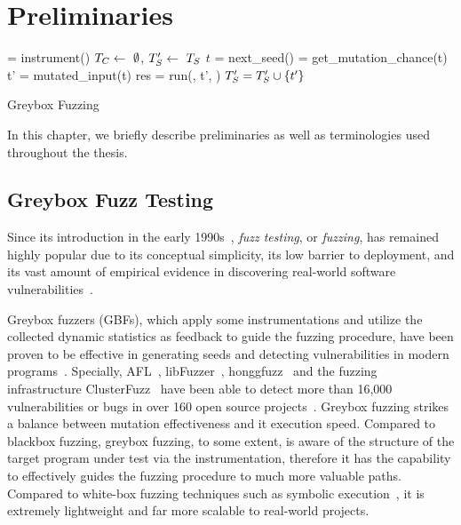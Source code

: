 \chapter{Preliminaries} \label{ch:preliminaries}

\begin{algorithm}[t]
 \small
{}
	\Prog = instrument(\ProgO) 
	$T_{C} \leftarrow~\emptyset$, $T^{\prime}_{S} \leftarrow~T_{S}$\; 
	 {
		$t$ = next\_seed(\FinalSeeds) 
		\mutChance = get\_mutation\_chance(t)  \label{line:algo:energy}
		 {
			t' = mutated\_input(t)  
			res = run(\Prog, t', \Ncal)
			 {\label{line:algo:new_cov}
				$T^{\prime}_{S} = T^{\prime}_{S}\cup\{t'\}$  \label{line:algo:triage_end}
			}
		}
	}
	\caption{Greybox Fuzzing}\label{algo:gbf}
\end{algorithm}

In this chapter, we briefly describe preliminaries as well as terminologies used throughout the thesis.

\section{Greybox Fuzz Testing}\label{sec:intro-gbf}
Since its introduction in the early 1990s~\cite{fuzzing1990}, \emph{fuzz testing}, or \emph{fuzzing}, has remained highly popular due to its conceptual simplicity, its low barrier to deployment, and its vast amount of empirical evidence in discovering real-world software vulnerabilities~\cite{fuzz_survey}.

Greybox fuzzers (GBFs), which apply some instrumentations and utilize the collected dynamic statistics as feedback to guide the fuzzing procedure, have been proven to be effective in generating seeds and detecting vulnerabilities in modern programs~\cite{fuzz_survey}. Specially, AFL~\cite{afl}, libFuzzer~\cite{libfuzzer}, honggfuzz~\cite{honggfuzz} and the fuzzing infrastructure ClusterFuzz~\cite{clusterfuzz} have been able to detect more than 16,000 vulnerabilities or bugs in over 160 open source projects~\cite{afl,clusterfuzz}. Greybox fuzzing strikes a balance between mutation effectiveness and it execution speed. Compared to blackbox fuzzing, greybox fuzzing, to some extent, is aware of the structure of the target program under test via the instrumentation, therefore it has the capability to effectively guides the fuzzing procedure to much more valuable paths. Compared to white-box fuzzing techniques such as symbolic execution~\cite{dart,klee}, it is extremely lightweight and far more scalable to real-world projects.


